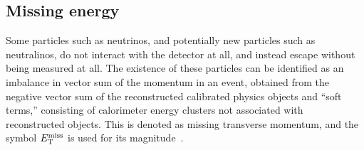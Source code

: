 \FloatBarrier
\subsection{Missing energy} 
\label{sec:met}

Some particles such as neutrinos, and potentially new particles such as
neutralinos, do not interact with the detector at all, and instead escape
without being measured at all.
The existence of these particles can be identified as an imbalance in vector
sum of the momentum in an event, obtained from the negative vector sum of the
reconstructed calibrated physics objects and ``soft terms,'' consisting of
calorimeter energy clusters not associated with reconstructed objects.
This is denoted as missing transverse momentum, and the symbol
$E_{\mathrm{T}}^{\mathrm{miss}}$ is used for its magnitude~\cite{ATLAS-CONF-2013-082}.
